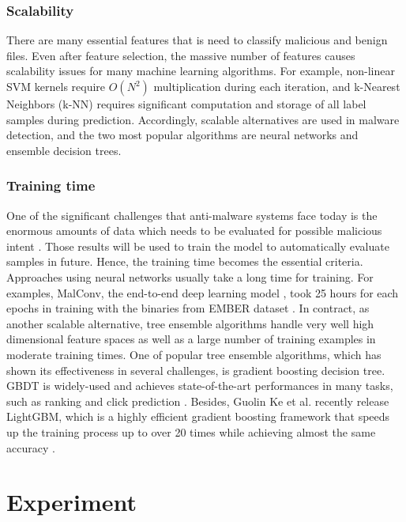 \documentclass[runningheads]{llncs}
\begin{document}
\subsubsection{Scalability}

There are many essential features that is need to classify malicious and benign files. Even after feature selection, the massive number of features causes scalability issues for many machine learning algorithms. For example,  non-linear  SVM  kernels require $O(N^2)$ multiplication during each iteration, and k-Nearest Neighbors (k-NN) requires significant computation and storage of all label samples during prediction. Accordingly, scalable alternatives are used in malware detection, and the two most popular algorithms are neural networks and ensemble decision trees.

\subsubsection{Training time}

One of the significant challenges that anti-malware systems face today is the enormous amounts of data which needs to be evaluated for possible malicious intent \cite{ronen2018microsoft}. Those results will be used to train the model to automatically evaluate samples in future. Hence, the training time becomes the essential criteria. Approaches using neural networks usually take a long time for training. For examples, MalConv, the end-to-end deep learning model \cite{raff2017malware}, took 25 hours for each epochs in training with the binaries from EMBER dataset \cite{anderson2018ember}. In contract, as another scalable alternative, tree ensemble algorithms handle very well high dimensional feature spaces as well as a large number of training examples in moderate training times. One of popular tree ensemble algorithms, which has shown its effectiveness in several challenges, is gradient boosting decision tree. GBDT is widely-used and achieves state-of-the-art performances in many tasks, such as ranking \cite{chris2010ranknet} and click prediction \cite{richardson2007predicting}. Besides, Guolin Ke et al. recently release LightGBM, which is a highly efficient gradient boosting framework that speeds up the training process up to over 20 times while achieving almost the same accuracy \cite{ke2017lightgbm}.

\section{Experiment}
\end{document}

